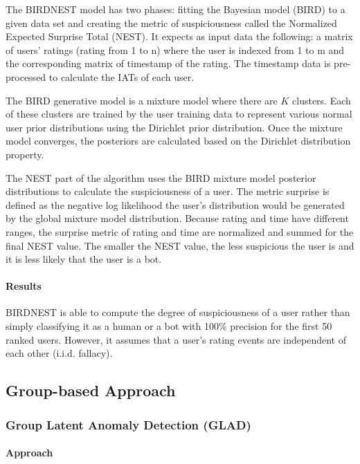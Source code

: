 \documentclass[11pt, oneside]{article}   	%
\begin{document}
\quad The BIRDNEST model has two phases: fitting the Bayesian model (BIRD) to a given data set and creating the metric of suspiciousness called the Normalized Expected Surprise Total (NEST).
It expects as input data the following: a matrix of users' ratings (rating from 1 to n) where the user is indexed from 1 to m and the corresponding matrix of timestamp of the rating.
The timestamp data is pre-processed to calculate the IATs of each user.

\quad The BIRD generative model is a mixture model where there are $K$ clusters.
Each of these clusters are trained by the user training data to represent various normal user prior distributions using the Dirichlet prior distribution.
Once the mixture model converges, the posteriors are calculated based on the Dirichlet distribution property.

\quad The NEST part of the algorithm uses the BIRD mixture model posterior distributions to calculate the suspiciousness of a user.
The metric surprise is defined as the negative log likelihood the user's distribution would be generated by the global mixture model distribution.
Because rating and time have different ranges, the surprise metric of rating and time are normalized and summed for the final NEST value.
The smaller the NEST value, the less suspicious the user is and it is less likely that the user is a bot.

\paragraph{Results}
\quad

\quad BIRDNEST is able to compute the degree of suspiciousness of a user rather than simply classifying it as a human or a bot with 100\% precision for the first 50 ranked users. However, it assumes that a user's rating events are independent of each other (i.i.d. fallacy).

\subsection{Group-based Approach}

\subsubsection{Group Latent Anomaly Detection (GLAD)}

\paragraph{Approach}
\quad
\end{document}
